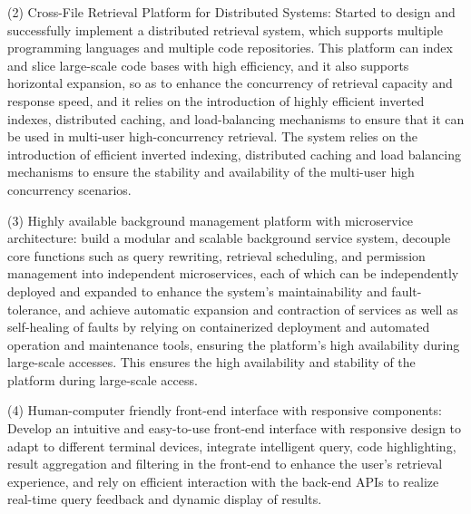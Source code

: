 \documentclass[UTF8,a4paper,12pt]{ctexart}
\numberwithin{equation}{section}
\begin{document}
(2) Cross-File Retrieval Platform for Distributed Systems: Started to design and successfully implement a distributed retrieval system, which supports multiple programming languages and multiple code repositories. This platform can index and slice large-scale code bases with high efficiency, and it also supports horizontal expansion, so as to enhance the concurrency of retrieval capacity and response speed, and it relies on the introduction of highly efficient inverted indexes, distributed caching, and load-balancing mechanisms to ensure that it can be used in multi-user high-concurrency retrieval. The system relies on the introduction of efficient inverted indexing, distributed caching and load balancing mechanisms to ensure the stability and availability of the multi-user high concurrency scenarios. \par

(3) Highly available background management platform with microservice architecture: build a modular and scalable background service system, decouple core functions such as query rewriting, retrieval scheduling, and permission management into independent microservices, each of which can be independently deployed and expanded to enhance the system's maintainability and fault-tolerance, and achieve automatic expansion and contraction of services as well as self-healing of faults by relying on containerized deployment and automated operation and maintenance tools, ensuring the platform's high availability during large-scale accesses. This ensures the high availability and stability of the platform during large-scale access. \par

(4) Human-computer friendly front-end interface with responsive components: Develop an intuitive and easy-to-use front-end interface with responsive design to adapt to different terminal devices, integrate intelligent query, code highlighting, result aggregation and filtering in the front-end to enhance the user's retrieval experience, and rely on efficient interaction with the back-end APIs to realize real-time query feedback and dynamic display of results. \par
\end{document}
